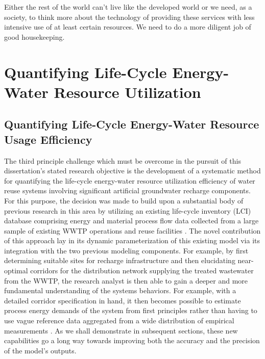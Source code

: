\begin{savequote}[75mm]
Either the rest of the world can't live like the developed world or we need, as a society, to think more about the technology of providing these services with less intensive use of at least certain  resources. We need to do a more diligent job of good housekeeping.
\end{savequote}

\chapter{Quantifying Life-Cycle Energy-Water Resource Utilization}
\label{Chapter 3}

\newpage

\section{Quantifying Life-Cycle Energy-Water Resource Usage Efficiency}

The third principle challenge which must be overcome in the pursuit of this dissertation's stated research objective is the development of a systematic method for quantifying the life-cycle energy-water resource utilization efficiency of water reuse systems involving significant artificial groundwater recharge components. For this purpose, the decision was made to build upon a substantial body of previous research in this area by utilizing an existing life-cycle inventory (LCI) database comprising energy and material process flow data collected from a large sample of existing WWTP operations and reuse facilities \cite{Stokes2006, Stokes2011, Stokes2014}. The novel contribution of this approach lay in its dynamic parameterization of this existing model via its integration with the two previous modeling components. For example, by first determining suitable sites for recharge infrastructure and then elucidating near-optimal corridors for the distribution network supplying the treated wastewater from the WWTP, the research analyst is then able to gain a deeper and more fundamental understanding of the systems behaviors. For example, with a detailed corridor specification in hand, it then becomes possible to estimate process energy demands of the system from first principles rather than having to use vague reference data aggregated from a wide distribution of empirical measurements \cite{Klein2005}. As we shall demonstrate in subsequent sections, these new capabilities go a long way towards improving both the accuracy and the precision of the model's outputs.

